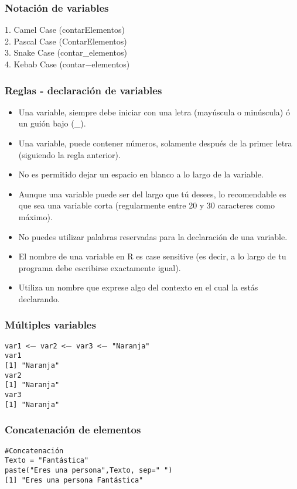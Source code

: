 \documentclass[12pt]{beamer}
\begin{document}
	\begin{frame}
		\frametitle{Notación de variables}
		
		1. Camel Case (contarElementos)\\
		2. Pascal Case (ContarElementos)\\
		3. Snake Case (contar\_elementos)\\
		4. Kebab Case (contar$-$elementos)
		
	\end{frame}

	\begin{frame}
	\frametitle{Reglas - declaración de variables}
	
	\begin{itemize}
		\item Una variable, siempre debe iniciar con una letra (mayúscula o minúscula) ó un guión bajo (\_).
		\item Una variable, puede contener números, solamente después de  la primer letra (siguiendo la regla anterior).
		\item No es permitido dejar un espacio en blanco a lo largo de la variable.
		\item Aunque una variable puede ser del largo que tú desees, lo recomendable es que sea una variable corta (regularmente entre 20 y 30 caracteres como máximo).
		\item No puedes utilizar palabras reservadas para la declaración de una variable.
		\item El nombre de una variable en R es case sensitive (es decir, a lo largo de tu programa debe escribirse exactamente igual).
		\item Utiliza un nombre que exprese algo del contexto en el cual la estás declarando.
	\end{itemize}
\end{frame}


	\begin{frame}
		\frametitle{Múltiples variables }
		\texttt{var1 <$-$ var2 <$-$ var3 <$-$ "Naranja"}\\
		\texttt{var1}\\
		\texttt{[1] "Naranja"}\\
		\texttt{var2}\\
		\texttt{[1] "Naranja"}\\
		\texttt{var3}\\
		\texttt{[1] "Naranja"}
	\end{frame}
	

	\begin{frame}
		\frametitle{Concatenación de elementos}
		\texttt{\#Concatenación}\\
		\texttt{Texto = "Fantástica"}\\
		\texttt{paste("Eres una persona",Texto, sep=" ")}\\
		\texttt{[1] "Eres una persona Fantástica"}
	\end{frame}
\end{document}
